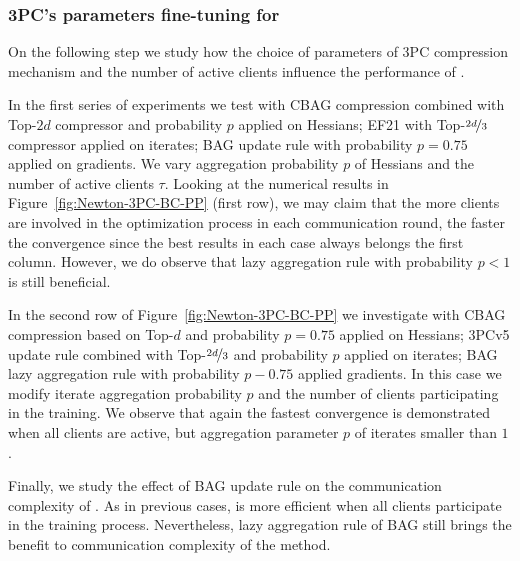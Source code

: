 \documentclass[11pt]{article}
\begin{document}
	\subsubsection{3PC's parameters fine-tuning for }
	
	On the following step we study how the choice of parameters of 3PC compression mechanism and the number of active clients influence the performance of . 
	
	In the first series of experiments we test  with CBAG compression combined with Top-$2d$ compressor and probability $p$ applied on Hessians; EF21 with Top-$\nicefrac{2d}{3}$ compressor applied on iterates; BAG update rule with probability $p=0.75$ applied on gradients. We vary aggregation probability $p$ of Hessians and the number of active clients $\tau$. Looking at the numerical results in Figure~\ref{fig:Newton-3PC-BC-PP} (first row), we may claim that the more clients are involved in the optimization process in each communication round, the faster the convergence since the best results in each case always belongs the first column. However, we do observe that lazy aggregation rule with probability $p < 1$ is still beneficial.
	
	In the second row of Figure~\ref{fig:Newton-3PC-BC-PP} we investigate  with CBAG compression based on Top-$d$ and probability $p=0.75$ applied on Hessians; 3PCv5 update rule combined with Top-$\nicefrac{2d}{3}$ and probability $p$ applied on iterates; BAG lazy aggregation rule with probability $p-0.75$ applied gradients. In this case we modify iterate aggregation probability $p$ and the number of clients participating in the training. We observe that again the fastest convergence is demonstrated when all clients are active, but aggregation parameter $p$ of iterates smaller than $1$.
	
	Finally, we study the effect of BAG update rule on the communication complexity of . As in previous cases,  is more efficient when all clients participate in the training process. Nevertheless, lazy aggregation rule of BAG still brings the benefit to communication complexity of the method. 
	
\end{document}

